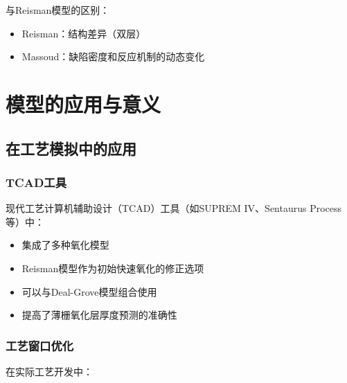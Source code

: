 \documentclass[UTF8,12pt,a4paper]{ctexart}
\begin{document}
与Reisman模型的区别：
\begin{itemize}
    \item Reisman：结构差异（双层）
    \item Massoud：缺陷密度和反应机制的动态变化
\end{itemize}

\newpage
\section{模型的应用与意义}

\subsection{在工艺模拟中的应用}

\subsubsection{TCAD工具}

现代工艺计算机辅助设计（TCAD）工具（如SUPREM IV、Sentaurus Process等）中：

\begin{itemize}
    \item 集成了多种氧化模型
    \item Reisman模型作为初始快速氧化的修正选项
    \item 可以与Deal-Grove模型组合使用
    \item 提高了薄栅氧化层厚度预测的准确性
\end{itemize}

\subsubsection{工艺窗口优化}

在实际工艺开发中：
\end{document}
